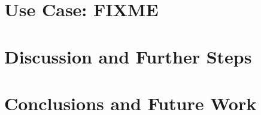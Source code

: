 \documentclass{llncs}
\begin{document}
\section{Use Case: FIXME}
\section{Discussion and Further Steps}

\section{Conclusions and Future Work}



\end{document}
